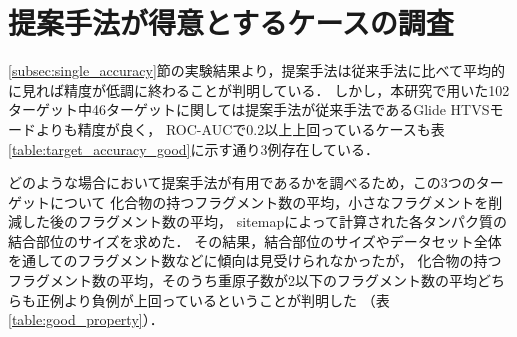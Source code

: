 \newpage

\section{提案手法が得意とするケースの調査}
\ref{subsec:single_accuracy}節の実験結果より，提案手法は従来手法に比べて平均的に見れば精度が低調に終わることが判明している．
しかし，本研究で用いた102ターゲット中46ターゲットに関しては提案手法が従来手法であるGlide HTVSモードよりも精度が良く，
ROC-AUCで0.2以上上回っているケースも表\ref{table:target_accuracy_good}に示す通り3例存在している．

どのような場合において提案手法が有用であるかを調べるため，この3つのターゲットについて
化合物の持つフラグメント数の平均，小さなフラグメントを削減した後のフラグメント数の平均，
sitemap\cite{Halgren2009}によって計算された各タンパク質の結合部位のサイズを求めた．
その結果，結合部位のサイズやデータセット全体を通してのフラグメント数などに傾向は見受けられなかったが，
化合物の持つフラグメント数の平均，そのうち重原子数が2以下のフラグメント数の平均どちらも正例より負例が上回っているということが判明した
（表\ref{table:good_property}）．

